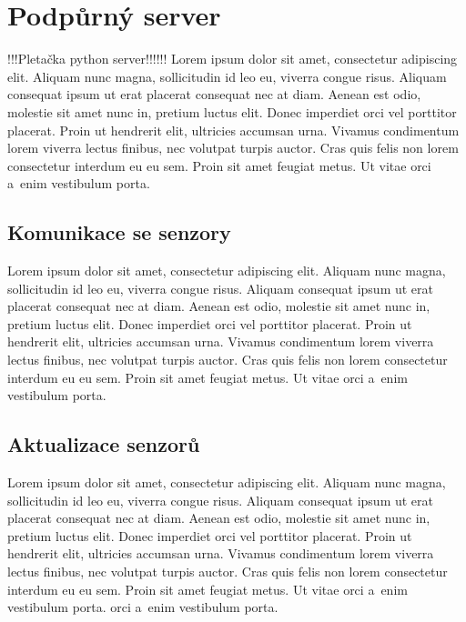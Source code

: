 \chapter{Podpůrný server}

!!!Pletačka python server!!!!!!
Lorem ipsum dolor sit amet, consectetur adipiscing elit.
Aliquam nunc magna, sollicitudin id leo eu, viverra congue risus.
Aliquam consequat ipsum ut erat placerat consequat nec at diam. 
Aenean est odio, molestie sit amet nunc in, pretium luctus elit. 
Donec imperdiet orci vel porttitor placerat. 
Proin ut hendrerit elit, ultricies accumsan urna. 
Vivamus condimentum lorem viverra lectus finibus, nec volutpat turpis auctor.
Cras quis felis non lorem consectetur interdum eu eu sem. 
Proin sit amet feugiat metus. 
Ut vitae orci a~enim vestibulum porta. 



\section{Komunikace se senzory}
Lorem ipsum dolor sit amet, consectetur adipiscing elit.
Aliquam nunc magna, sollicitudin id leo eu, viverra congue risus.
Aliquam consequat ipsum ut erat placerat consequat nec at diam. 
Aenean est odio, molestie sit amet nunc in, pretium luctus elit. 
Donec imperdiet orci vel porttitor placerat. 
Proin ut hendrerit elit, ultricies accumsan urna. 
Vivamus condimentum lorem viverra lectus finibus, nec volutpat turpis auctor.
Cras quis felis non lorem consectetur interdum eu eu sem. 
Proin sit amet feugiat metus. 
Ut vitae orci a~enim vestibulum porta. 

\section{Aktualizace senzorů}
Lorem ipsum dolor sit amet, consectetur adipiscing elit.
Aliquam nunc magna, sollicitudin id leo eu, viverra congue risus.
Aliquam consequat ipsum ut erat placerat consequat nec at diam. 
Aenean est odio, molestie sit amet nunc in, pretium luctus elit. 
Donec imperdiet orci vel porttitor placerat. 
Proin ut hendrerit elit, ultricies accumsan urna. 
Vivamus condimentum lorem viverra lectus finibus, nec volutpat turpis auctor.
Cras quis felis non lorem consectetur interdum eu eu sem. 
Proin sit amet feugiat metus. 
Ut vitae orci a~enim vestibulum porta. 
orci a~enim vestibulum porta. 



\newpage